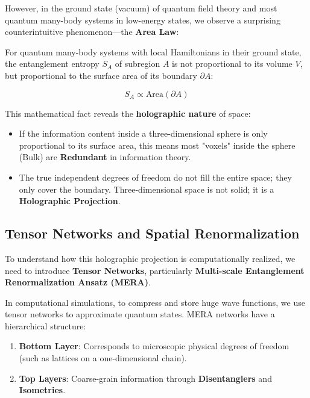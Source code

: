However, in the ground state (vacuum) of quantum field theory and most quantum many-body systems in low-energy states, we observe a surprising counterintuitive phenomenon—the \textbf{Area Law}:

\begin{theorem}
For quantum many-body systems with local Hamiltonians in their ground state, the entanglement entropy $S_A$ of subregion $A$ is not proportional to its volume $V$, but proportional to the surface area of its boundary $\partial A$:

\begin{equation}
S_A \propto \text{Area}(\partial A)
\end{equation}
\end{theorem}

This mathematical fact reveals the \textbf{holographic nature} of space:

\begin{itemize}
\item If the information content inside a three-dimensional sphere is only proportional to its surface area, this means most "voxels" inside the sphere (Bulk) are \textbf{Redundant} in information theory.

\item The true independent degrees of freedom do not fill the entire space; they only cover the boundary. Three-dimensional space is not solid; it is a \textbf{Holographic Projection}.
\end{itemize}

\subsection{Tensor Networks and Spatial Renormalization}

To understand how this holographic projection is computationally realized, we need to introduce \textbf{Tensor Networks}, particularly \textbf{Multi-scale Entanglement Renormalization Ansatz (MERA)}.

In computational simulations, to compress and store huge wave functions, we use tensor networks to approximate quantum states. MERA networks have a hierarchical structure:

\begin{enumerate}
\item \textbf{Bottom Layer}: Corresponds to microscopic physical degrees of freedom (such as lattices on a one-dimensional chain).

\item \textbf{Top Layers}: Coarse-grain information through \textbf{Disentanglers} and \textbf{Isometries}.
\end{enumerate}

